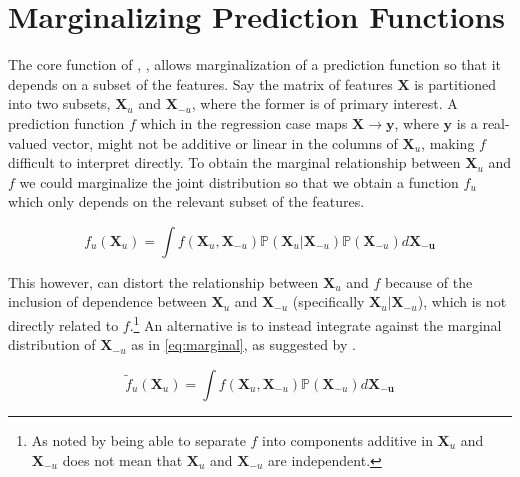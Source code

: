 \section{Marginalizing Prediction Functions}

The core function of , , allows marginalization of a prediction function so that it depends on a subset of the features. Say the matrix of features $\mathbf{X}$ is partitioned into two subsets, $\mathbf{X}_u$ and $\mathbf{X}_{-u}$, where the former is of primary interest. A prediction function $f$ which in the regression case maps $\mathbf{X} \rightarrow \mathbf{y}$, where $\mathbf{y}$ is a real-valued vector, might not be additive or linear in the columns of $\mathbf{X}_u$, making $f$ difficult to interpret directly. To obtain the marginal relationship between $\mathbf{X}_u$ and $f$ we could marginalize the joint distribution so that we obtain a function $f_u$ which only depends on the relevant subset of the features.

$$f_u (\mathbf{X}_u) = \int f(\mathbf{X}_u, \mathbf{X}_{-u}) \mathbb{P}(\mathbf{X}_u | \mathbf{X}_{-u}) \mathbb{P}(\mathbf{X}_{-u}) d \mathbf{X_{-u}} \label{eq:joint}$$

This however, can distort the relationship between $\mathbf{X}_u$ and $f$ because of the inclusion of dependence between $\mathbf{X}_u$ and $\mathbf{X}_{-u}$ (specifically $\mathbf{X}_u | \mathbf{X}_{-u}$), which is not directly related to $f$.\footnote{As noted by \cite{hooker2004discovering} being able to separate $f$ into components additive in $\mathbf{X}_u$ and $\mathbf{X}_{-u}$ does not mean that $\mathbf{X}_u$ and $\mathbf{X}_{-u}$ are independent.} An alternative is to instead integrate against the marginal distribution of $\mathbf{X}_{-u}$ as in \ref{eq:marginal}, as suggested by \citep{friedman2001greedy}.

$$\tilde{f}_u (\mathbf{X}_u) = \int f(\mathbf{X}_u, \mathbf{X}_{-u}) \mathbb{P}(\mathbf{X}_{-u}) d \mathbf{X_{-u}}  \label{eq:marginal}$$


